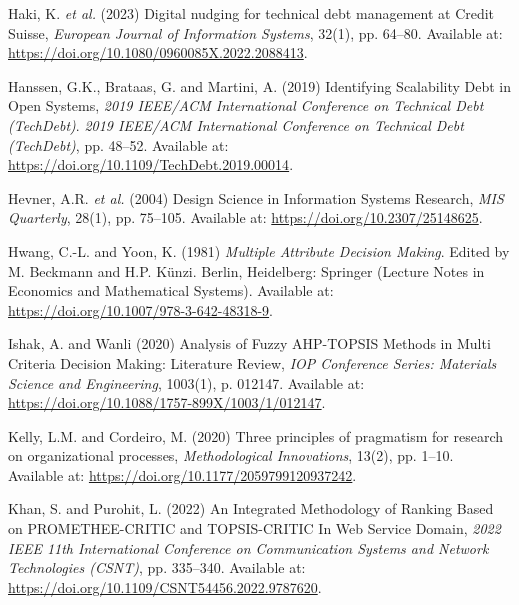 \documentclass[
  12pt,
  letterpaper,
  12pt,
  oneside,
  english,
  onehalfspacing,
  headsepline]{MastersDoctoralThesis}
\newlength{\cslhangindent}
\newenvironment{CSLReferences}[2] %
 {\begin{list}{}{%
  \setlength{\itemindent}{0pt}
  \setlength{\leftmargin}{0pt}
  \setlength{\parsep}{0pt}
  \ifodd #1
   \setlength{\leftmargin}{\cslhangindent}
   \setlength{\itemindent}{-1\cslhangindent}
  \fi
  \setlength{\itemsep}{#2\baselineskip}}}
 {\end{list}}
\begin{document}
\begin{CSLReferences}{0}{1}
Haki, K. \emph{et al.} (2023) \textquotesingle Digital nudging for
technical debt management at {Credit Suisse}\textquotesingle,
\emph{European Journal of Information Systems}, 32(1), pp. 64--80.
Available at: \url{https://doi.org/10.1080/0960085X.2022.2088413}.

Hanssen, G.K., Brataas, G. and Martini, A. (2019)
\textquotesingle Identifying {Scalability Debt} in {Open
Systems}\textquotesingle, \emph{2019 {IEEE}/{ACM International
Conference} on {Technical Debt} ({TechDebt})}. \emph{2019 {IEEE}/{ACM
International Conference} on {Technical Debt} ({TechDebt})}, pp. 48--52.
Available at: \url{https://doi.org/10.1109/TechDebt.2019.00014}.

Hevner, A.R. \emph{et al.} (2004) \textquotesingle Design {Science} in
{Information Systems Research}\textquotesingle, \emph{MIS Quarterly},
28(1), pp. 75--105. Available at:
\url{https://doi.org/10.2307/25148625}.

Hwang, C.-L. and Yoon, K. (1981) \emph{Multiple {Attribute Decision
Making}}. Edited by M. Beckmann and H.P. Künzi. Berlin, Heidelberg:
Springer (Lecture {Notes} in {Economics} and {Mathematical Systems}).
Available at: \url{https://doi.org/10.1007/978-3-642-48318-9}.

Ishak, A. and Wanli (2020) \textquotesingle Analysis of {Fuzzy
AHP-TOPSIS Methods} in {Multi Criteria Decision Making}: {Literature
Review}\textquotesingle, \emph{IOP Conference Series: Materials Science
and Engineering}, 1003(1), p. 012147. Available at:
\url{https://doi.org/10.1088/1757-899X/1003/1/012147}.

Kelly, L.M. and Cordeiro, M. (2020) \textquotesingle Three principles of
pragmatism for research on organizational processes\textquotesingle,
\emph{Methodological Innovations}, 13(2), pp. 1--10. Available at:
\url{https://doi.org/10.1177/2059799120937242}.

Khan, S. and Purohit, L. (2022) \textquotesingle An {Integrated
Methodology} of {Ranking Based} on {PROMETHEE-CRITIC} and {TOPSIS-CRITIC
In Web Service Domain}\textquotesingle, \emph{2022 {IEEE} 11th
{International Conference} on {Communication Systems} and {Network
Technologies} ({CSNT})}, pp. 335--340. Available at:
\url{https://doi.org/10.1109/CSNT54456.2022.9787620}.


\end{CSLReferences}
\end{document}
